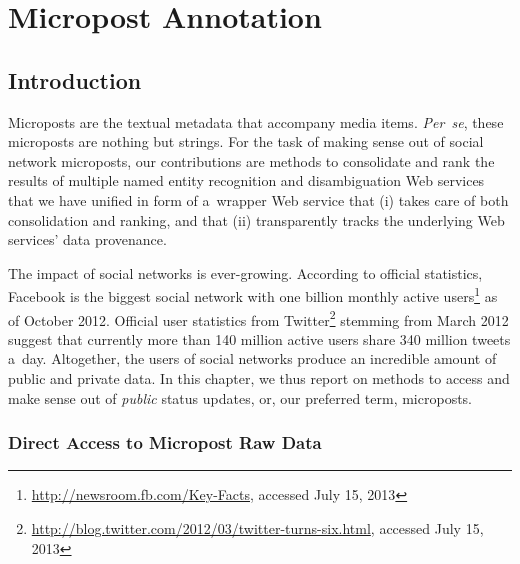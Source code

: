 \chapter{Micropost Annotation}
\label{cha:micropost-annotation}

\ifpdf
    \graphicspath{{4_micropost_annotation/figures/PNG/}{4_micropost_annotation/figures/PDF/}{4_micropost_annotation/figures/}}
\else
    \graphicspath{{4_micropost_annotation/figures/EPS/}{4_micropost_annotation/figures/}}
\fi

\section{Introduction}

Microposts are the textual metadata that accompany media items.
\emph{Per~se}, these microposts are nothing but strings.
For the task of making sense out of social network microposts,
our contributions are methods to consolidate and rank
the results of multiple named entity recognition and
disambiguation Web services that we have unified in form
of a~wrapper Web service that (i) takes care of both
consolidation and ranking, and that
(ii) transparently tracks the underlying Web services'
data provenance.

The impact of social networks is ever-growing.
According to official statistics, Facebook is the biggest
social network with one billion monthly active
users\footnote{\url{http://newsroom.fb.com/Key-Facts},
accessed July 15, 2013}
as of October 2012.
Official user statistics from
Twitter\footnote{\url{http://blog.twitter.com/2012/03/twitter-turns-six.html},
accessed July 15, 2013}
stemming from March 2012 suggest
that currently more than 140 million active users
share 340 million tweets a~day.
Altogether, the users of social networks
produce an incredible amount of public and private data.
In this chapter, we thus report on methods to access and make sense
out of \emph{public} status updates,
or, our preferred term, microposts.

\subsection{Direct Access to Micropost Raw Data}

